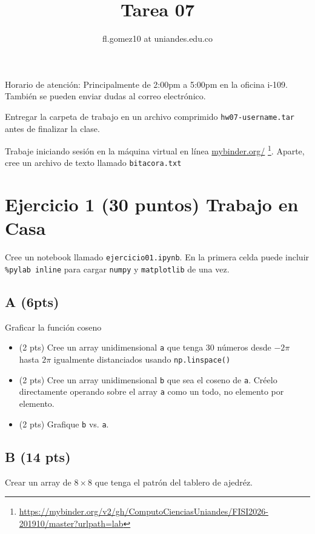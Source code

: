 \documentclass{article}
\title{Tarea 07}
\author{fl.gomez10 at uniandes.edu.co}
\begin{document}
\maketitle

Horario de atención: Principalmente de 2:00pm a 5:00pm en la oficina i-109. También se pueden enviar dudas al correo electrónico.

Entregar la carpeta de trabajo en un archivo comprimido \texttt{hw07-username.tar} antes de finalizar la clase. 

Trabaje iniciando  sesión en la máquina virtual en línea
\href{https://mybinder.org/v2/gh/ComputoCienciasUniandes/FISI2026-201910/master?urlpath=lab}{mybinder.org/}
\footnote{\url{https://mybinder.org/v2/gh/ComputoCienciasUniandes/FISI2026-201910/master?urlpath=lab}}. 
Aparte, cree un archivo de texto llamado \texttt{bitacora.txt}


\section{Ejercicio 1 (30 puntos) Trabajo en Casa}

Cree un notebook llamado \texttt{ejercicio01.ipynb}. En la primera celda puede incluir
\texttt{\%pylab inline} para cargar \texttt{numpy} y \texttt{matplotlib} de una vez.

\subsection{A (6pts)}
Graficar la función coseno 
\begin{itemize}
\item (2 pts) Cree un array unidimensional \texttt{a} que tenga 30 números desde $-2\pi$ hasta
  $2\pi$ igualmente distanciados usando \texttt{np.linspace()}
\item (2 pts) Cree un array unidimensional \texttt{b} que sea el coseno de \texttt{a}.
  Créelo directamente operando sobre el array \texttt{a} como un todo, no elemento por
  elemento.
\item (2 pts) Grafique \texttt{b} vs. \texttt{a}.
\end{itemize}

\subsection{B (14 pts)}
Crear un array de $8 \times 8$ que tenga el patrón del tablero de ajedréz.
\end{document}
